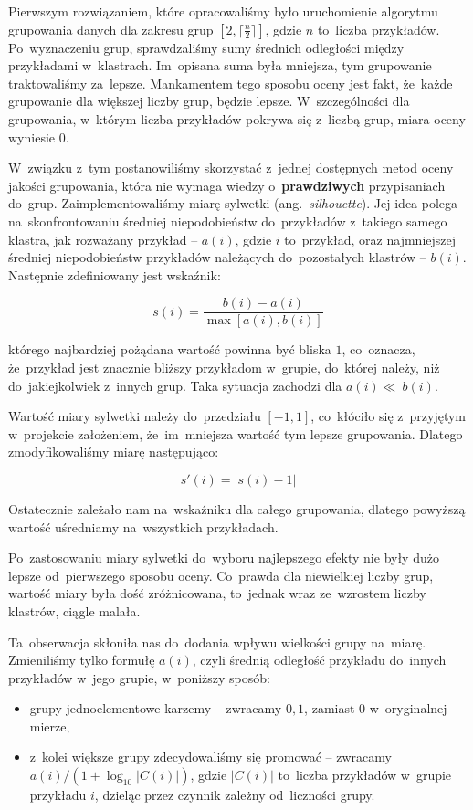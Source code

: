 \documentclass[a4paper,12pt]{mwart}
\newcommand{\ang}[1]{ang.~{\itshape #1}}
\begin{document}
Pierwszym rozwiązaniem, które opracowaliśmy było uruchomienie algorytmu
grupowania danych dla zakresu grup $[2, \lceil \frac{n}{2} \rceil]$, gdzie $n$
to~liczba przykładów. Po~wyznaczeniu grup, sprawdzaliśmy sumy średnich
odległości między przykładami w~klastrach. Im~opisana suma była mniejsza, tym
grupowanie traktowaliśmy za~lepsze. Mankamentem tego sposobu oceny jest fakt,
że~każde grupowanie dla większej liczby grup, będzie lepsze. W~szczególności
dla grupowania, w~którym liczba przykładów pokrywa się z~liczbą grup, miara
oceny wyniesie $0$.

W~związku z~tym postanowiliśmy skorzystać z~jednej dostępnych metod oceny
jakości grupowania, która nie wymaga wiedzy o~\textbf{prawdziwych}
przypisaniach do~grup. Zaimplementowaliśmy miarę sylwetki (\ang{silhouette}).
Jej idea polega na~skonfrontowaniu średniej niepodobieństw do~przykładów
z~takiego samego klastra, jak rozważany przykład -- $a(i)$, gdzie $i$
to~przykład, oraz najmniejszej średniej niepodobieństw przykładów należących
do~pozostałych klastrów -- $b(i)$. Następnie zdefiniowany jest wskaźnik:

\[s(i) = \frac{b(i) - a(i)}{\max[a(i), b(i)]}\]

którego najbardziej pożądana wartość powinna być bliska $1$, co~oznacza,
że~przykład jest znacznie bliższy przykładom w~grupie, do~której należy, niż
do~jakiejkolwiek z~innych grup. Taka sytuacja zachodzi dla $a(i) \ll~b(i)$.

Wartość miary sylwetki należy do~przedziału $[-1, 1]$, co~kłóciło się
z~przyjętym w~projekcie założeniem, że~im~mniejsza wartość tym lepsze
grupowania. Dlatego zmodyfikowaliśmy miarę następująco:

\[s'(i) = \left | s(i) - 1 \right | \]

Ostatecznie zależało nam na~wskaźniku dla całego grupowania, dlatego powyższą
wartość uśredniamy na~wszystkich przykładach.

Po~zastosowaniu miary sylwetki do~wyboru najlepszego efekty nie były dużo
lepsze od~pierwszego sposobu oceny. Co~prawda dla niewielkiej liczby grup,
wartość miary była dość zróżnicowana, to~jednak wraz ze~wzrostem liczby
klastrów, ciągle malała.

Ta~obserwacja skłoniła nas do~dodania wpływu wielkości grupy na~miarę.
Zmieniliśmy tylko formułę $a(i)$, czyli średnią odległość przykładu do~innych
przykładów w~jego grupie, w~poniższy sposób:

\begin{itemize}
\item grupy jednoelementowe karzemy -- zwracamy $0{,}1$, zamiast $0$
  w~oryginalnej mierze,
\item z~kolei większe grupy zdecydowaliśmy się promować -- zwracamy $a(i) /
  \left (1 + \log_{10} \left | C(i) \right | \right)$, gdzie $\left | C(i)
  \right |$ to~liczba przykładów w~grupie przykładu $i$, dzieląc przez czynnik
  zależny od~liczności grupy.
\end{itemize}
\end{document}
